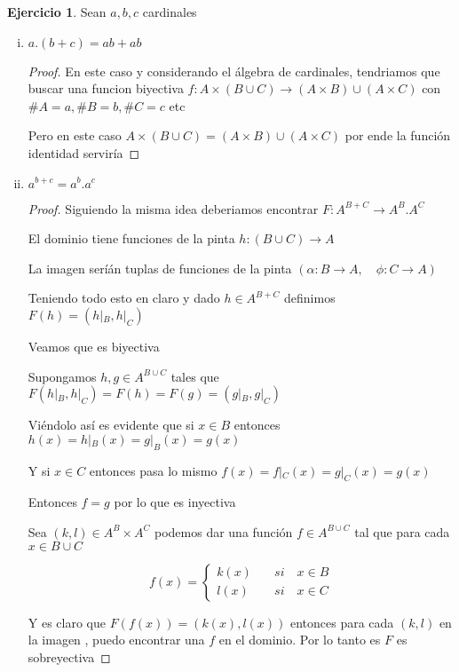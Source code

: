 \documentclass[12pt]{article}
\newcommand{\ra}{\rightarrow}
\theoremstyle{definition}
\newtheorem{ej}{Ejercicio}
\begin{document}
\begin{ej}
\noindent  Sean $a,b,c$ cardinales
\begin{enumerate}[i.]
  \item $a.(b+c) = ab + ab$
    \begin{proof}
      En este caso y considerando el álgebra de cardinales, tendriamos que buscar una funcion biyectiva $f: A \times (B \cup C) \ra (A \times B) \cup (A \times C)$ con $\# A = a, \# B = b, \# C = c$ etc 

      Pero en este caso $A \times (B \cup C) = (A \times B) \cup (A \times C)$ por ende la función identidad serviría
    \end{proof}
  
  \item $a^{b + c} = a^b.a^c$
 
    \begin{proof}
      Siguiendo la misma idea deberiamos encontrar $F: A^{B + C} \ra A^B.A^C$

      El dominio tiene funciones de la pinta $h:(B \cup C) \ra A$

      La imagen seríán tuplas de funciones de la pinta $(\alpha : B \ra A , \quad \phi : C \ra A)$

      Teniendo todo esto en claro y dado $h \in A^{B + C}$ definimos $F(h) = (h|_{B},h|_{C})$

      Veamos que es biyectiva

      Supongamos $h,g \in A^{B \cup C}$ tales que $F(h|_{B},h|_{C}) = F(h) = F(g) = (g|_{B},g|_{C})$ 

      Viéndolo así es evidente que si $x \in B$ entonces $h(x) = h|_{B}(x) = g|_{B}(x) = g(x)$

      Y si $x \in C$ entonces pasa lo mismo $f(x) = f|_{C}(x) = g|_{C}(x) = g(x)$

      Entonces $f = g$ por lo que es inyectiva

      Sea $(k,l) \in A^B \times A^C$ podemos dar una función $f \in A^{B \cup C}$ tal que para cada $x \in B \cup C$

$$
f(x) = \left\{
        \begin{array}{ll}
	  k(x)  & \quad si \quad x \in B \\
	l(x)  & \quad si \quad x \in C 
        \end{array}
    \right.
$$

Y es claro que $F(f(x)) = (k(x),l(x))$ entonces para cada $(k,l)$ en la imagen , puedo encontrar una $f$ en el dominio. Por lo tanto es $F$ es sobreyectiva 


\end{proof}
\end{enumerate}
\end{ej}
\end{document}
